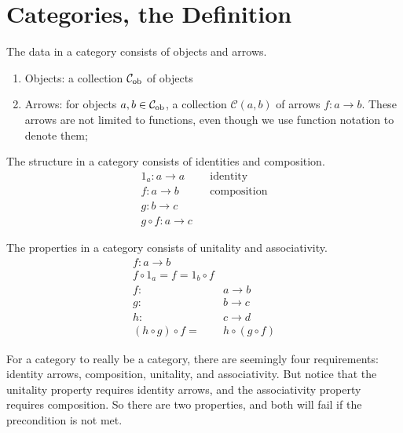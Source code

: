 \setcounter{section}{7}
\section{Categories, the Definition}
\begin{definition}
    The data in a category consists of objects and arrows.
    \begin{enumerate}
    \item Objects: a collection $\mathcal{C}_{\text{ob}}{}$ of objects
        \item Arrows: for objects $a, b\in \mathcal{C}_{\text{ob}}{}$, a collection
        $\mathcal{C}(a, b)$ of arrows $f: a\rightarrow b$. These arrows are not
        limited to functions, even though we use function notation to denote
        them;
    \end{enumerate}
\end{definition}
\begin{definition}
The structure in a category consists of identities and composition.
\begin{align*}
1_a : a \rightarrow a&&\text{identity}\\
f: a\rightarrow b&&\text{composition}\\
g: b\rightarrow c\\
g\circ f: a\rightarrow c
\end{align*}
\end{definition}
\begin{definition}
The properties in a category consists of unitality and associativity.
\begin{align*}
f: a\rightarrow b\\
f\circ 1_a = f = 1_b \circ f\\
    f:& a\rightarrow b\\
    g:& b\rightarrow c\\
    h:& c\rightarrow d\\
    (h\circ g)\circ f=&h\circ (g \circ f)
\end{align*}
\end{definition}
For a category to really be a category, there are seemingly four requirements:
identity arrows, composition, unitality, and associativity. But notice that the
unitality property requires identity arrows, and the associativity property
requires composition. So there are two properties, and both will fail if the
precondition is not met.
